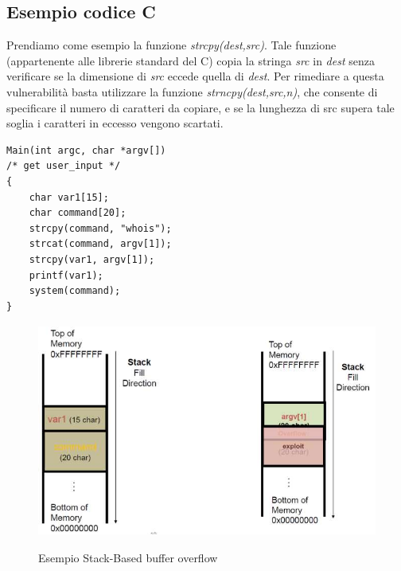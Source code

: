 \subsection{Esempio codice C}
Prendiamo come esempio la funzione \textit{strcpy(dest,src)}. Tale funzione (appartenente alle librerie standard del C) copia la stringa \textit{src} in \textit{dest} senza verificare se la dimensione di \textit{src} eccede quella di \textit{dest}. Per rimediare a questa vulnerabilità basta utilizzare la funzione \textit{strncpy(dest,src,n)}, che consente di specificare il numero di caratteri da copiare, e se la lunghezza di src supera tale soglia i caratteri in eccesso vengono scartati.
\begin{algorithm}
\begin{lstlisting}[caption={Esempio codice vulnerabile al buffer overflow in C}]
Main(int argc, char *argv[])
/* get user_input */
{
	char var1[15];
	char command[20];
	strcpy(command, "whois");
	strcat(command, argv[1]);
	strcpy(var1, argv[1]);
	printf(var1);
	system(command);
}
\end{lstlisting}
\end{algorithm}
\begin{figure}[htbp]
	\centering%
	\subfigure%
	{\includegraphics[height=7cm, width=13cm, keepaspectratio]{Immagini/sistemi_operativi/esempio_stack_2.png}}
	\caption{Esempio Stack-Based buffer overflow\label{fig:esempio_stack}} 	
\end{figure}

